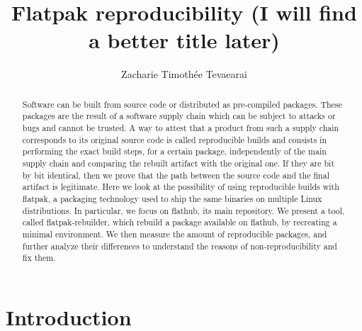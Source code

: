 \documentclass[a4paper,11pt,oneside]{report}
\title{Flatpak reproducibility (I will find a better title later)}
\author{Zacharie Timothée Tevaearai}
\theoremstyle{definition}
\newcommand{\sysname}{flatpak-rebuilder\xspace}
\newcommand{\rb}{reproducible builds\xspace}
\newcommand{\fp}{flatpak\xspace}
\newcommand{\fh}{flathub\xspace}
\begin{document}
\maketitle

\begin{abstract}
Software can be built from source code or distributed as pre-compiled packages.
These packages are the result of a software supply chain which can be
subject to attacks or bugs and cannot be trusted. A way to attest that a
product from such a supply chain corresponds to its original source code is
called \rb and consists in performing the exact build steps, for a certain
package, independently of the main supply chain and comparing the rebuilt
artifact with the original one. If they are bit by bit identical, then we
prove that the path between the source code and the final artifact is
legitimate. Here we look at the possibility of using reproducible builds
with \fp, a packaging technology used to ship the same binaries on multiple
Linux distributions. In particular, we focus on \fh, its main repository. We
present a tool, called \sysname, which rebuild a package available on \fh,
by recreating a minimal environment. We then measure the amount of
reproducible packages, and further analyze their differences to understand
the reasons of non-reproducibility and fix them.
\end{abstract}

\maketoc

\chapter{Introduction}
\end{document}
